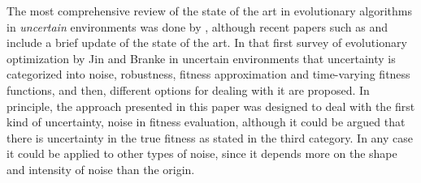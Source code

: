 \documentclass{svmult}
\begin{document}
\sloppypar The most comprehensive review of the state of the art in evolutionary
algorithms in {\em uncertain} environments 
was done by %
\cite{Jin2005303}, although recent
papers such as \cite{DBLP:journals/corr/QianYZ13,6931307} and \cite{Qian:sampling} include a brief update of the state
of the art. In that first survey 
of evolutionary optimization by Jin and Branke  in
uncertain environments that uncertainty is categorized into noise,
robustness, fitness approximation and time-varying fitness functions, and then,
different options for dealing with it are proposed. In principle, the
approach presented in this paper was designed to deal with the first kind of
uncertainty, noise in fitness evaluation, although it could be argued
that there is uncertainty in the true fitness as stated in the third
category. In any case it could be applied to
other types of noise, since it depends more on the shape and intensity
of noise than the origin. 
\end{document}
